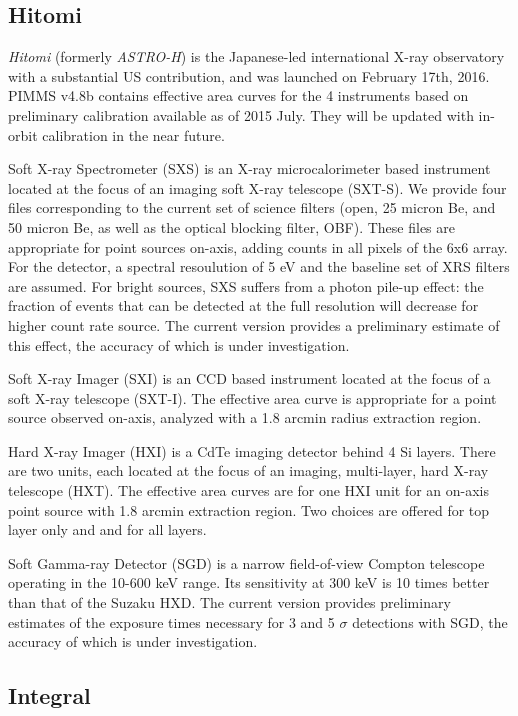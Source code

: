 \documentclass[11pt]{article}
\begin{document}
\subsection{Hitomi}

{\sl Hitomi\/} (formerly {\em ASTRO-H\/}) is the Japanese-led international
X-ray observatory with a substantial US contribution, and was launched on
February 17th, 2016. PIMMS v4.8b contains effective area curves for the 4
instruments based on preliminary calibration available as of 2015 July.
They will be updated with in-orbit calibration in the near future.

Soft X-ray Spectrometer (SXS) is an X-ray microcalorimeter based instrument
located at the focus of an imaging soft X-ray telescope (SXT-S).  We provide
four files corresponding to the current set of science filters (open, 25
micron Be, and 50 micron Be, as well as the optical blocking filter, OBF).
These files are appropriate for point sources on-axis, adding counts in all
pixels of the 6x6 array.  For the detector, a spectral resoulution of 5 eV
and the baseline set of XRS filters are assumed.  For bright sources, SXS
suffers from a photon pile-up effect: the fraction of events that can be
detected at the full resolution will decrease for higher count rate source.
The current version provides a preliminary estimate of this effect, the
accuracy of which is under investigation.

Soft X-ray Imager (SXI) is an CCD based instrument located at the focus of
a soft X-ray telescope (SXT-I).  The effective area curve is appropriate for
a point source observed on-axis, analyzed with a 1.8 arcmin radius extraction
region.

Hard X-ray Imager (HXI) is a CdTe imaging detector behind 4 Si layers.
There are two units, each located at the focus of an imaging, multi-layer,
hard X-ray telescope (HXT).  The effective area curves are for one HXI
unit for an on-axis point source with 1.8 arcmin extraction region.
Two choices are offered for top layer only and and for all layers.

Soft Gamma-ray Detector (SGD) is a narrow field-of-view Compton telescope
operating in the 10-600 keV range.  Its sensitivity at 300 keV is 10 times
better than that of the Suzaku HXD.  The current version provides preliminary
estimates of the exposure times necessary for 3 and 5 $\sigma$ detections with
SGD, the accuracy of which is under investigation.

\subsection{Integral}
\end{document}
